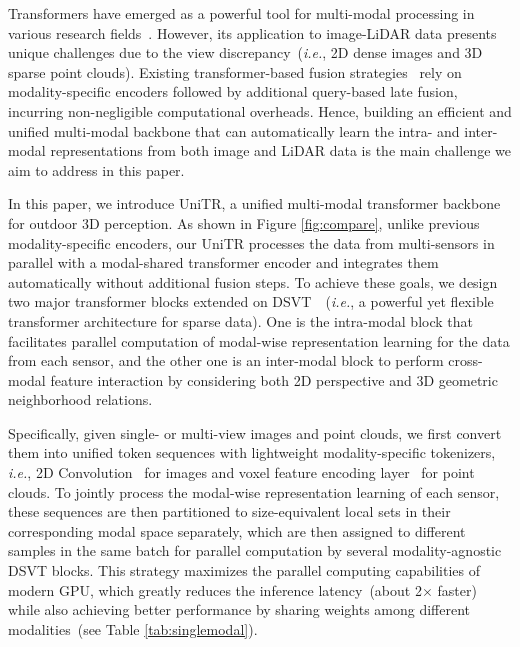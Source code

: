 \documentclass[10pt,twocolumn,letterpaper]{article}
\begin{document}
Transformers have emerged as a powerful tool for multi-modal processing in various research fields~\cite{chen2020uniter,li2019visualbert,shi2022motion,zhu2022uni}.
However, its application to image-LiDAR data presents unique challenges due to the view discrepancy~(\textit{i.e.}, 2D dense images and 3D sparse point clouds). Existing transformer-based fusion strategies~\cite{bai2022transfusion,chen2022futr3d,li2022unifying} rely on modality-specific encoders followed by additional query-based late fusion, incurring non-negligible computational overheads. Hence, building an efficient and unified multi-modal backbone that can automatically learn the intra- and inter-modal representations from both image and LiDAR data is the main challenge we aim to address in this paper.
    
In this paper, we introduce UniTR, a unified multi-modal transformer backbone for outdoor 3D perception. As shown in Figure \ref{fig:compare}, unlike previous modality-specific encoders, our UniTR processes the data from multi-sensors in parallel with a modal-shared transformer encoder and integrates them automatically without additional fusion steps. To achieve these goals, we design two major transformer blocks extended on DSVT~\cite{wang2023dsvt}~(\textit{i.e.}, a powerful yet flexible transformer architecture for sparse data). One is the intra-modal block that facilitates parallel computation of modal-wise representation learning for the data from each sensor, and the other one is an inter-modal block to perform cross-modal feature interaction by considering both 2D perspective and 3D geometric neighborhood relations. 

Specifically, given single- or multi-view images and point clouds,  we first convert them into unified token sequences with lightweight modality-specific tokenizers, \textit{i.e.}, 2D Convolution~\cite{krizhevsky2017imagenet} for images and voxel feature encoding layer~\cite{zhou2020end} for point clouds. To jointly process the modal-wise representation learning of each sensor, these sequences are then partitioned to size-equivalent local sets in their corresponding modal space separately, which are then assigned to different samples in the same batch for parallel computation by several modality-agnostic DSVT blocks. This strategy maximizes the parallel computing capabilities of modern GPU, which greatly reduces the inference latency~(about 2$\times$ faster) 
 while also achieving better performance by sharing weights among different modalities~(see Table \ref{tab:singlemodal}). 
\end{document}
